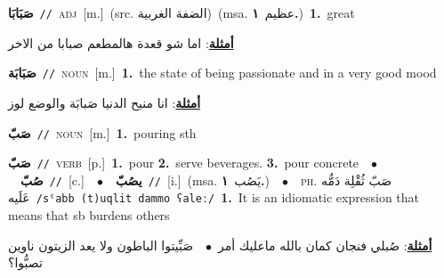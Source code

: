\documentclass[10pt,a4paper,twoside]{article} %
\begin{document}
\begin{multicols}{2}
{\setlength\topsep{0pt}\textbf{\foreignlanguage{arabic}{صَبَابَا}}\ {\color{gray}\texttt{//}\color{black}}\ \textsc{adj}\ [m.]\ (src. \color{gray}\foreignlanguage{arabic}{الضفة الغربية}\color{black})\ \color{gray}(msa. \foreignlanguage{arabic}{عظيم}~\foreignlanguage{arabic}{\textbf{١.}})\color{black}\ \textbf{1.}~great\  \begin{flushright}\color{gray}\foreignlanguage{arabic}{\textbf{\underline{\foreignlanguage{arabic}{أمثلة}}}: اما شو قعدة هالمطعم صبابا من الاخر}\end{flushright}\color{black}} \vspace{2mm}

{\setlength\topsep{0pt}\textbf{\foreignlanguage{arabic}{صَبَابَة}}\ {\color{gray}\texttt{//}\color{black}}\ \textsc{noun}\ [m.]\ \textbf{1.}~the state of being passionate and in a very good mood\  \begin{flushright}\color{gray}\foreignlanguage{arabic}{\textbf{\underline{\foreignlanguage{arabic}{أمثلة}}}: انا منيح الدنيا صَبابَة والوضع لوز}\end{flushright}\color{black}} \vspace{2mm}

{\setlength\topsep{0pt}\textbf{\foreignlanguage{arabic}{صَبّ}}\ {\color{gray}\texttt{//}\color{black}}\ \textsc{noun}\ [m.]\ \textbf{1.}~pouring sth\ } \vspace{2mm}

{\setlength\topsep{0pt}\textbf{\foreignlanguage{arabic}{صَبّ}}\ {\color{gray}\texttt{//}\color{black}}\ \textsc{verb}\ [p.]\ \textbf{1.}~pour  \textbf{2.}~serve beverages.  \textbf{3.}~pour concrete\ \ $\bullet$\ \ \setlength\topsep{0pt}\textbf{\foreignlanguage{arabic}{صُبّ}}\ {\color{gray}\texttt{//}\color{black}}\ [c.]\ \ $\bullet$\ \ \setlength\topsep{0pt}\textbf{\foreignlanguage{arabic}{يصُبّ}}\ {\color{gray}\texttt{//}\color{black}}\ [i.]\ \color{gray}(msa. \foreignlanguage{arabic}{يَصُب}~\foreignlanguage{arabic}{\textbf{١.}})\color{black}\ \ $\bullet$\ \ \textsc{ph.} \color{gray} \foreignlanguage{arabic}{صَبّ ثُقْلِة دَمُّه عَلَيه}\color{black}\ {\color{gray}\texttt{/{\sffamily sˤabb (t)uqlit dammo ʕaleː}/}\color{black}}\ \textbf{1.}~It is an idiomatic expression that means that sb burdens others\  \begin{flushright}\color{gray}\foreignlanguage{arabic}{\textbf{\underline{\foreignlanguage{arabic}{أمثلة}}}: صُبلي فنجان كمان بالله ماعليك أمر\ $\bullet$\ \  صَبِّيتوا الباطون ولا يعد الزيتون ناوين تصبُّوا؟}\end{flushright}\color{black}} \vspace{2mm}


\end{multicols}
\end{document}

